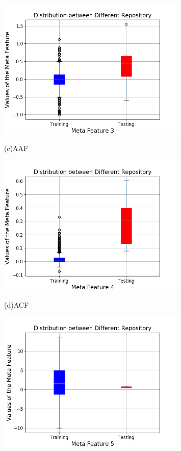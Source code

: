 \documentclass[aspectratio=1610]{beamer}
\begin{document}
\begin{frame}
\begin{figure}
\begin{minipage}[t]{0.25\linewidth}
		\centering
		\includegraphics[width=0.8\textwidth]{Figures/Meta_Features/Feature_3.png}
		\parbox{1cm}{\small \hspace{3.5cm}(c)\scriptsize{AAF}}
	\end{minipage}
	\hspace{3ex}
	\begin{minipage}[t]{0.25\linewidth}
		\centering
		\includegraphics[width=0.8\textwidth]{Figures/Meta_Features/Feature_4.png}
		\parbox{1cm}{\small \hspace{3.5cm}(d)\scriptsize{ACF}}
	\end{minipage}
	\begin{minipage}[t]{0.25\linewidth}
		\centering
		\includegraphics[width=0.8\textwidth]{Figures/Meta_Features/Feature_5.png}

\end{minipage}
\end{figure}
\end{frame}
\end{document}
